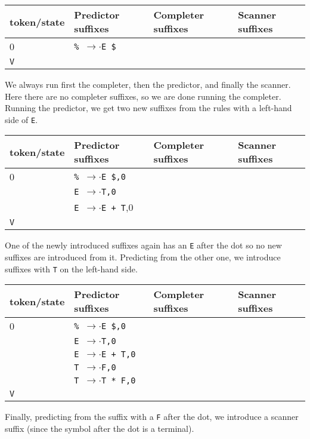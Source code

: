 \documentclass[11pt]{article}
\def\ra{\rightarrow}
\begin{document}
\begin{tabular}{|l|l|l|l|}
\hline
token/state & Predictor suffixes & Completer suffixes & Scanner suffixes\\
\hline
0      & \texttt{\% $\rightarrow$$\cdot$E \$} & & \\
\hline
\texttt{V} &  & &\\
\hline
\end{tabular}

We always run first the completer, then the predictor, and finally the
scanner.  Here there are no completer suffixes, so we are done running
the completer.  Running the predictor, we get two new suffixes from
the rules with a left-hand side of \texttt{E}.

\begin{tabular}{|l|l|l|l|}
\hline
token/state & Predictor suffixes & Completer suffixes & Scanner suffixes\\
\hline
0     & \texttt{\% $\ra$$\cdot$E \$,0} & & \\
      & \texttt{E $\ra$$\cdot$T,0} & & \\
      & \texttt{E $\ra$$\cdot$E + T},0 & & \\
\hline
\texttt{V}     &  & &\\
\hline
\end{tabular}

One of the newly introduced suffixes again has an \texttt{E} after the
dot so no new suffixes are introduced from it.  Predicting from the
other one, we introduce suffixes with \texttt{T} on the left-hand
side. 

\begin{tabular}{|l|l|l|l|}
\hline
token/state & Predictor suffixes & Completer suffixes & Scanner suffixes\\
\hline
0     & \texttt{\% $\ra$$\cdot$E \$,0} & & \\
      & \texttt{E $\ra$$\cdot$T,0} & & \\
      & \texttt{E $\ra$$\cdot$E + T,0} & & \\
      & \texttt{T $\ra$$\cdot$F,0} & & \\
      & \texttt{T $\ra$$\cdot$T * F,0} & & \\
\hline
\texttt{V}     &  & &\\
\hline
\end{tabular}

Finally, predicting from the suffix with a \texttt{F} after the dot,
we introduce a scanner suffix (since the symbol after the dot is a terminal).
\end{document}
